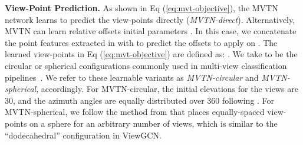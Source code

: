 \documentclass[10pt,twocolumn,letterpaper]{article}
\newcommand{\eqLabel}[1]{{Eq (#1)}}
\newcommand{\mysection}[1]{\noindent\textbf{#1.}}
\begin{document}
\begin{table}[t]
\tabcolsep=0.08cm
    \centering
{}
\vspace{2pt}
    \caption{\textbf{3D Point Cloud Classification on ScanObjectNN}. We compare the performance of MVTN in 3D point cloud classification on three different variants of ScanObjectNN \cite{scanobjectnn}. The variants include object with background, object only, and the hardest variant.}
    \label{tab:Scanobjectnn}
\end{table}

\mysection{View-Point Prediction}
As shown in \eqLabel{\ref{eq:mvt-objective}}, the MVTN  network learns to predict the view-points directly (\textit{MVTN-direct}). Alternatively, MVTN can learn relative offsets \wrt initial parameters . In this case, we concatenate the point features extracted in  with  to predict the offsets to apply on .
The learned view-points  in \eqLabel{\ref{eq:mvt-objective}} are defined as: . 
We take  to be the circular or spherical configurations commonly used in multi-view classification pipelines~\cite{mvcnn,mvrotationnet,mvviewgcn}.
We refer to these learnable variants as \textit{MVTN-circular} and \textit{MVTN-spherical}, accordingly. 
For MVTN-circular, the initial elevations for the views are  30, and the azimuth angles are equally distributed over 360 following \cite{mvcnn}. For MVTN-spherical, we follow the method from \cite{spherical-config} that places equally-spaced view-points on a sphere for an arbitrary number of views, which is similar to the ``dodecahedral'' configuration in ViewGCN. 
\end{document}
